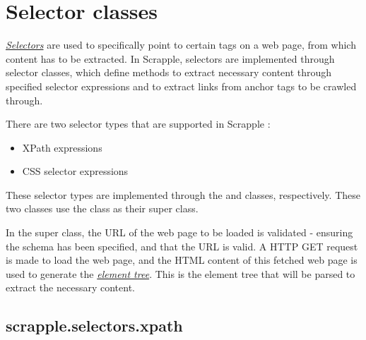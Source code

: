 \documentclass[letterpaper,12pt,english]{sphinxmanual}
\begin{document}
\section{Selector classes}
\label{implementation/selectors:selector-classes}\label{implementation/selectors::doc}\label{implementation/selectors:implementation-selectors}
{\hyperref[concepts/selectors:concepts-selectors]{\emph{Selectors}}} are used to specifically point to certain tags on a web page, from which content has to be extracted. In Scrapple, selectors are implemented through selector classes, which define methods to extract necessary content through specified selector expressions and to extract links from anchor tags to be crawled through.

There are two selector types that are supported in Scrapple :
\begin{itemize}
\item {} 
XPath expressions

\item {} 
CSS selector expressions

\end{itemize}

These selector types are implemented through the  and  classes, respectively. These two classes use the  class as their super class.

In the super class, the URL of the web page to be loaded is validated - ensuring the schema has been specified, and that the URL is valid. A HTTP GET request is made to load the web page, and the HTML content of this fetched web page is used to generate the {\hyperref[concepts/structure:concepts-structure]{\emph{element tree}}}. This is the element tree that will be parsed to extract the necessary content.
\label{implementation/selectors:module-scrapple.selectors.xpath}

\subsection{scrapple.selectors.xpath}
\label{implementation/selectors:scrapple-selectors-xpath}
\end{document}
